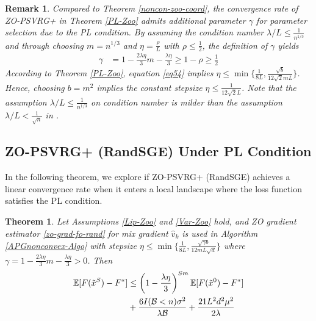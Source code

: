 \documentclass[iicol,sn-basic]{sn-jnl}
\theoremstyle{thmstyleone}%
\newtheorem{theorem}{Theorem}%
\theoremstyle{thmstyletwo}%
\newtheorem{remark}{Remark}%
\theoremstyle{thmstylethree}%
\newcommand*{\E}{\mathbb{E}}
\begin{document}
\begin{remark}
Compared to Theorem \ref{noncon-zoo-coord}, the convergence rate of ZO-PSVRG+ in Theorem \ref{PL-Zoo} admits additional parameter $\gamma$ for parameter selection due to the PL condition. 
By assuming the condition number $\lambda/L\leq \frac{1}{n^{1/3}}$ and through choosing $m = n^{1/3}$ and $\eta = \frac{\rho}{L}$ with $\rho\leq \frac{1}{2}$, the definition of $\gamma$ yields  
\begin{align}
\gamma &= 1-\frac{2\lambda\eta}{3} m-\frac{\lambda\eta}{3} \geq  1 - \rho \geq \frac{1}{2}\label{eq54}
\end{align}
According to Theorem \ref{PL-Zoo}, equation \eqref{eq54} implies $\eta \leq \min\{\frac{1}{8L}, \frac{\sqrt{b}}{12\sqrt{2} m L }\}$. 
Hence, choosing $b = m^{2}$ implies the constant stepsize  $\eta \leq \frac{1}{12\sqrt{2} L}$.
Note that the assumption $\lambda/L \leq \frac{1}{{n}^{1/3}}$ on condition number is milder than the assumption $\lambda/L < \frac{1}{\sqrt{n}}$ in \cite{reddi2016proximal}.
\end{remark}
\subsection{ZO-PSVRG+ (RandSGE) Under PL Condition}
In the following theorem, we explore if ZO-PSVRG+ (RandSGE) achieves a linear convergence rate when it enters a local landscape where the loss function satisfies the PL condition.
\begin{theorem}\label{PL-Zoo-rand}
Let Assumptions \ref{Lip-Zoo} and \ref{Var-Zoo} hold, and  ZO gradient estimator \eqref{zo-grad-fo-rand} for mix gradient $\hat{v}_k$ is used in
 Algorithm \ref{APGnonconvex-Algo} with stepsize $\eta \leq \min\{\frac{1}{8L}, \frac{\sqrt{\gamma b}}{12 m L \sqrt{d}}\}$ where $\gamma = 1-\frac{2\lambda\eta}{3} m-\frac{\lambda\eta}{3} > 0$. Then 
\begin{align}
\E[F(\tilde{x}^S) - {F}^*] & \leq   \left(1-\frac{\lambda\eta}{3}\right)^{Sm} \E[F(\tilde{x}^0) - {F}^*]\notag\\
&  + \frac{6I(\mathcal{B} < n) \sigma ^2}{\lambda\mathcal{B}}+\frac{21 L^2 d^2 \mu^2}{2\lambda}\label{PL-eq-error-rand}
\end{align}
\end{theorem}
\end{document}
